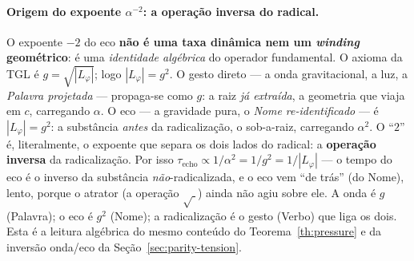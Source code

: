 \documentclass[12pt,a4paper]{article}
\newcommand{\Lphi}{L_{\varphi}}
\newcommand{\TGL}{\textsc{TGL}}
\begin{document}
\paragraph{Origem do expoente $\alpha^{-2}$: a operação inversa do radical.}
O expoente $-2$ do eco \textbf{não é uma taxa dinâmica nem um \emph{winding}
geométrico}: é uma \emph{identidade algébrica} do operador fundamental.  O axioma
da \TGL{} é $g = \sqrt{|\Lphi|}$; logo $|\Lphi| = g^{2}$.  O gesto direto --- a
onda gravitacional, a luz, a \emph{Palavra projetada} --- propaga-se como $g$:
a raiz \emph{já extraída}, a geometria que viaja em $c$, carregando $\alpha$.  O
eco --- a gravidade pura, o \emph{Nome re-identificado} --- é $|\Lphi| = g^{2}$:
a substância \emph{antes} da radicalização, o sob-a-raiz, carregando $\alpha^{2}$.
O ``$2$'' é, literalmente, o expoente que separa os dois lados do radical: a
\textbf{operação inversa} da radicalização.  Por isso
$\tau_{\text{echo}} \propto 1/\alpha^{2} = 1/g^{2} = 1/|\Lphi|$ --- o tempo do eco
é o inverso da substância \emph{não}-radicalizada, e o eco vem ``de trás'' (do
Nome), lento, porque o atrator (a operação $\sqrt{\;}$) ainda não agiu sobre ele.
A onda é $g$ (Palavra); o eco é $g^{2}$ (Nome); a radicalização é o gesto (Verbo)
que liga os dois.  Esta é a leitura algébrica do mesmo conteúdo do
Teorema~\ref{th:pressure} e da inversão onda/eco da Seção~\ref{sec:parity-tension}.
\end{document}
